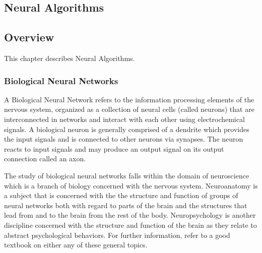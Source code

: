 

\renewcommand{\bibsection}{\subsection{\bibname}}
\begin{bibunit}

\chapter{Neural Algorithms}
\label{ch:neural}

\section{Overview}
This chapter describes Neural Algorithms.

\subsection{Biological Neural Networks}
A Biological Neural Network refers to the information processing elements of the nervous system, organized as a collection of neural cells (called neurons) that are interconnected in networks and interact with each other using electrochemical signals. A biological neuron is generally comprised of a dendrite which provides the input signals and is connected to other neurons via synapses. The neuron reacts to input signals and may produce an output signal on its output connection called an axon.

The study of biological neural networks falls within the domain of neuroscience which is a branch of biology concerned with the nervous system. 
Neuroanatomy is a subject that is concerned with the the structure and function of groups of neural networks both with regard to parts of the brain and the structures that lead from and to the brain from the rest of the body. 
Neuropsychology is another discipline concerned with the structure and function of the brain as they relate to abstract psychological behaviors.
For further information, refer to a good textbook on either any of these general topics.


\end{bibunit}
